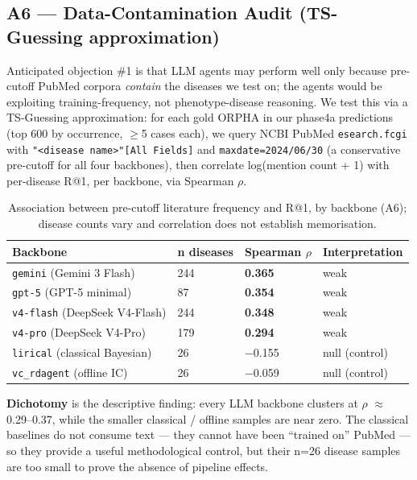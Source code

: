 \subsection{A6 --- Data-Contamination Audit (TS-Guessing approximation)}\label{sec-7-10}

Anticipated objection \#1 is that LLM agents may perform well only because
pre-cutoff PubMed corpora \emph{contain} the diseases we test on; the agents
would be exploiting training-frequency, not phenotype-disease reasoning.
We test this via a TS-Guessing approximation: for each gold ORPHA in
our phase4a predictions (top 600 by occurrence, \ensuremath{\geq}5 cases each), we
query NCBI PubMed \texttt{esearch.fcgi} with \texttt{"\textless{}disease\ name\textgreater{}"{[}All\ Fields{]}}
and \texttt{maxdate=2024/06/30} (a conservative pre-cutoff for all four
backbones), then correlate log(mention count + 1) with per-disease
R@1, per backbone, via Spearman \ensuremath{\rho}.

\begin{table}[t]
\centering\scriptsize\setlength{\tabcolsep}{3.5pt}
\caption{Association between pre-cutoff literature frequency and R@1, by backbone (A6); disease counts vary and correlation does not establish memorisation.}\label{tbl:contam}
\begin{tabular}{@{}
llll@{}}
\toprule
Backbone & n diseases & Spearman \ensuremath{\rho} & Interpretation \\
\midrule
\texttt{gemini} (Gemini 3 Flash) & 244 & \textbf{0.365} & weak \\
\texttt{gpt-5} (GPT-5 minimal) & 87 & \textbf{0.354} & weak \\
\texttt{v4-flash} (DeepSeek V4-Flash) & 244 & \textbf{0.348} & weak \\
\texttt{v4-pro} (DeepSeek V4-Pro) & 179 & \textbf{0.294} & weak \\
\texttt{lirical} (classical Bayesian) & 26 & \ensuremath{-}0.155 & null (control) \\
\texttt{vc\_rdagent} (offline IC) & 26 & \ensuremath{-}0.059 & null (control) \\
\bottomrule
\end{tabular}
\end{table}

\textbf{Dichotomy} is the descriptive finding: every LLM backbone clusters at
\ensuremath{\rho} \ensuremath{\approx} 0.29--0.37, while the smaller classical / offline samples are near zero. The
classical baselines do not consume text --- they cannot have been
``trained on'' PubMed --- so they provide a useful methodological control, but
their n=26 disease samples are too small to prove the absence of pipeline
effects.

